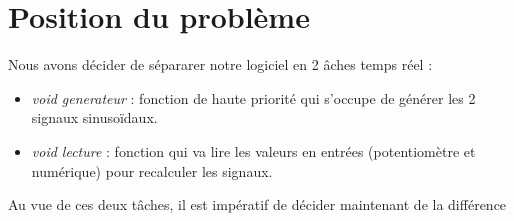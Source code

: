 \section{Position du problème}
Nous avons décider de sépararer notre logiciel en 2 âches temps réel : \begin{itemize}
\item \emph{void generateur} : fonction de haute priorité qui s'occupe de générer les 2 signaux sinusoïdaux. 
\item \emph{void lecture} : fonction qui va lire les valeurs en entrées (potentiomètre et numérique) pour recalculer les signaux.
\end{itemize}
Au vue de ces deux tâches, il est impératif de décider maintenant de la différence 
